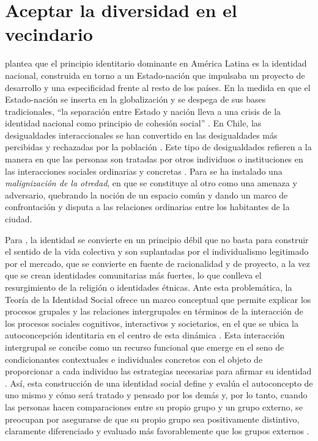 \documentclass[12pt,twoside]{templates/facsothesis}
\begin{document}
\hypertarget{aceptar-la-diversidad-en-el-vecindario}{%
\chapter{Aceptar la diversidad en el vecindario}\label{aceptar-la-diversidad-en-el-vecindario}}

\citet{castells_globalizacion_2005} plantea que el principio identitario dominante en América Latina es la identidad nacional, construida en torno a un Estado-nación que impulsaba un proyecto de desarrollo y una especificidad frente al resto de los países. En la medida en que el Estado-nación se inserta en la globalización y se despega de sus bases tradicionales, ``la separación entre Estado y nación lleva a una crisis de la identidad nacional como principio de cohesión social'' \citep[p.~40]{castells_globalizacion_2005}. En Chile, las desigualdades interaccionales se han convertido en las desigualdades más percibidas y rechazadas por la población \citep{araujo_igualdad_2013}. Este tipo de desigualdades refieren a la manera en que las personas son tratadas por otros individuos o instituciones en las interacciones sociales ordinarias y concretas \citep{araujo_percepcion_2019}. Para \citet{araujo_percepcion_2019} se ha instalado una \emph{malignización de la otredad}, en que se constituye al otro como una amenaza y adversario, quebrando la noción de un espacio común y dando un marco de confrontación y disputa a las relaciones ordinarias entre los habitantes de la ciudad.

Para \citet{castells_globalizacion_2005}, la identidad se convierte en un principio débil que no basta para construir el sentido de la vida colectiva y son suplantadas por el individualismo legitimado por el mercado, que se convierte en fuente de racionalidad y de proyecto, a la vez que se crean identidades comunitarias más fuertes, lo que conlleva el resurgimiento de la religión o identidades étnicas. Ante esta problemática, la Teoría de la Identidad Social ofrece un marco conceptual que permite explicar los procesos grupales y las relaciones intergrupales en términos de la interacción de los procesos sociales cognitivos, interactivos y societarios, en el que se ubica la autoconcepción identitaria en el centro de esta dinámica \citep{hogg_social_2016}. Esta interacción intergrupal se concibe como un recurso funcional que emerge en el seno de condicionantes contextuales e individuales concretos con el objeto de proporcionar a cada individuo las estrategias necesarias para afirmar su identidad \citep{scandroglio_teoria_2008}. Así, esta construcción de una identidad social define y evalúa el autoconcepto de uno mismo y cómo será tratado y pensado por los demás y, por lo tanto, cuando las personas hacen comparaciones entre su propio grupo y un grupo externo, se preocupan por asegurarse de que su propio grupo sea positivamente distintivo, claramente diferenciado y evaluado más favorablemente que los grupos externos \citep{hogg_social_2016}.
\end{document}
